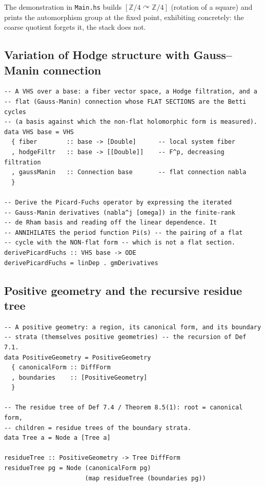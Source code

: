 \documentclass[12pt]{article}
\theoremstyle{definition}
\theoremstyle{remark}
\newcommand{\ZZ}{\mathbb{Z}}
\begin{document}
The demonstration in \texttt{Main.hs} builds $[\ZZ/4 \curvearrowright \ZZ/4]$ (rotation of a square) and
prints the automorphism group at the fixed point, exhibiting  concretely: the coarse
quotient forgets it, the stack does not.

\subsection{Variation of Hodge structure with Gauss--Manin connection}

\begin{verbatim}
-- A VHS over a base: a fiber vector space, a Hodge filtration, and a
-- flat (Gauss-Manin) connection whose FLAT SECTIONS are the Betti cycles
-- (a basis against which the non-flat holomorphic form is measured).
data VHS base = VHS
  { fiber        :: base -> [Double]      -- local system fiber
  , hodgeFiltr   :: base -> [[Double]]    -- F^p, decreasing filtration
  , gaussManin   :: Connection base       -- flat connection nabla
  }

-- Derive the Picard-Fuchs operator by expressing the iterated
-- Gauss-Manin derivatives (nabla^j [omega]) in the finite-rank
-- de Rham basis and reading off the linear dependence. It
-- ANNIHILATES the period function Pi(s) -- the pairing of a flat
-- cycle with the NON-flat form -- which is not a flat section.
derivePicardFuchs :: VHS base -> ODE
derivePicardFuchs = linDep . gmDerivatives
\end{verbatim}

\subsection{Positive geometry and the recursive residue tree}

\begin{verbatim}
-- A positive geometry: a region, its canonical form, and its boundary
-- strata (themselves positive geometries) -- the recursion of Def 7.1.
data PositiveGeometry = PositiveGeometry
  { canonicalForm :: DiffForm
  , boundaries    :: [PositiveGeometry]
  }

-- The residue tree of Def 7.4 / Theorem 8.5(1): root = canonical form,
-- children = residue trees of the boundary strata.
data Tree a = Node a [Tree a]

residueTree :: PositiveGeometry -> Tree DiffForm
residueTree pg = Node (canonicalForm pg)
                      (map residueTree (boundaries pg))
\end{verbatim}
\end{document}

